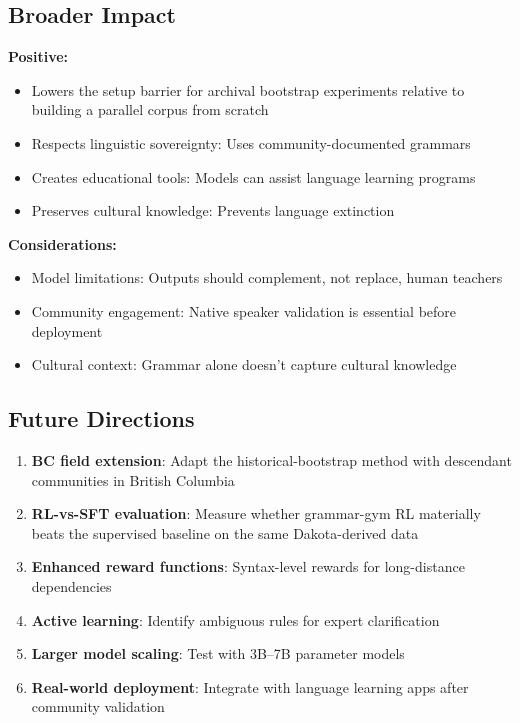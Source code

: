 \documentclass{article}
\begin{document}
\subsection{Broader Impact}

\textbf{Positive:}
\begin{itemize}
    \item Lowers the setup barrier for archival bootstrap experiments relative to building a parallel corpus from scratch
    \item Respects linguistic sovereignty: Uses community-documented grammars
    \item Creates educational tools: Models can assist language learning programs
    \item Preserves cultural knowledge: Prevents language extinction
\end{itemize}

\textbf{Considerations:}
\begin{itemize}
    \item Model limitations: Outputs should complement, not replace, human teachers
    \item Community engagement: Native speaker validation is essential before deployment
    \item Cultural context: Grammar alone doesn't capture cultural knowledge
\end{itemize}

\subsection{Future Directions}

\begin{enumerate}
    \item \textbf{BC field extension}: Adapt the historical-bootstrap method with descendant communities in British Columbia
    \item \textbf{RL-vs-SFT evaluation}: Measure whether grammar-gym RL materially beats the supervised baseline on the same Dakota-derived data
    \item \textbf{Enhanced reward functions}: Syntax-level rewards for long-distance dependencies
    \item \textbf{Active learning}: Identify ambiguous rules for expert clarification
    \item \textbf{Larger model scaling}: Test with 3B--7B parameter models
    \item \textbf{Real-world deployment}: Integrate with language learning apps after community validation
\end{enumerate}
\end{document}
